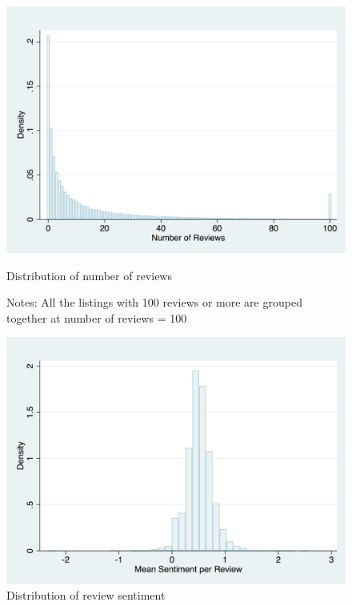 \begin{figure}\centering
	\includegraphics[width=.8\textwidth]{figures/num_reviews_dist-DISC-100}
	\caption{Distribution of number of reviews}
	\caption*{Notes: All the listings with 100 reviews or more are grouped together at number of reviews = 100}
	\label{fig:reviews}
\end{figure}

\begin{figure}\centering
	\includegraphics[width=.8\textwidth]{figures/review_sentiment_dist}
	\caption{Distribution of review sentiment}
	\label{fig:sentiment}
\end{figure}



% 























